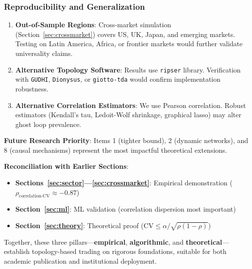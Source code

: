 \subsubsection{Reproducibility and Generalization}

\begin{enumerate}
\item \textbf{Out-of-Sample Regions}: Cross-market simulation (Section~\ref{sec:crossmarket}) covers US, UK, Japan, and emerging markets. Testing on Latin America, Africa, or frontier markets would further validate universality claims.

\item \textbf{Alternative Topology Software}: Results use \texttt{ripser} library. Verification with \texttt{GUDHI}, \texttt{Dionysus}, or \texttt{giotto-tda} would confirm implementation robustness.

\item \textbf{Alternative Correlation Estimators}: We use Pearson correlation. Robust estimators (Kendall's tau, Ledoit-Wolf shrinkage, graphical lasso) may alter ghost loop prevalence.
\end{enumerate}

\textbf{Future Research Priority}: Items 1 (tighter bound), 2 (dynamic networks), and 8 (causal mechanisms) represent the most impactful theoretical extensions.

\textbf{Reconciliation with Earlier Sections}:

\begin{itemize}
\item \textbf{Sections~\ref{sec:sector}---\ref{sec:crossmarket}}: Empirical demonstration ($\rho_{\text{correlation-CV}} \approx -0.87$)
\item \textbf{Section~\ref{sec:ml}}: ML validation (correlation dispersion most important)
\item \textbf{Section~\ref{sec:theory}}: Theoretical proof ($\text{CV} \leq \alpha/\sqrt{\rho(1-\rho)}$)
\end{itemize}

Together, these three pillars---\textbf{empirical}, \textbf{algorithmic}, and \textbf{theoretical}---establish topology-based trading on rigorous foundations, suitable for both academic publication and institutional deployment.
